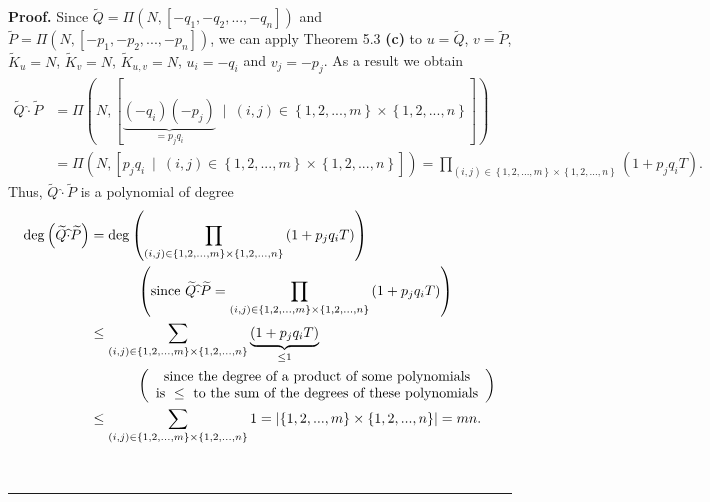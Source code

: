\documentclass[numbers=enddot,12pt,final,onecolumn,notitlepage]{scrartcl}%
\newenvironment{proof}[1][Proof]{\noindent\textbf{#1.} }{\ \rule{0.5em}{0.5em}}
\begin{document}
\begin{proof}
Since $\widetilde{Q}=\Pi\left(  N,\left[  -q_{1},-q_{2},...,-q_{n}\right]
\right)  $ and $\widetilde{P}=\Pi\left(  N,\left[  -p_{1},-p_{2}%
,...,-p_{n}\right]  \right)  $, we can apply Theorem 5.3 \textbf{(c)} to
$u=\widetilde{Q}$, $v=\widetilde{P}$, $\widetilde{K}_{u}=N$, $\widetilde{K}%
_{v}=N$, $\widetilde{K}_{u,v}=N$, $u_{i}=-q_{i}$ and $v_{j}=-p_{j}$. As a
result we obtain%
\begin{align*}
\widetilde{Q}\widehat{\cdot}\widetilde{P}  &  =\Pi\left(  N,\left[
\underbrace{\left(  -q_{i}\right)  \left(  -p_{j}\right)  }_{=p_{j}q_{i}%
}\ \mid\ \left(  i,j\right)  \in\left\{  1,2,...,m\right\}  \times\left\{
1,2,...,n\right\}  \right]  \right) \\
&  =\Pi\left(  N,\left[  p_{j}q_{i}\ \mid\ \left(  i,j\right)  \in\left\{
1,2,...,m\right\}  \times\left\{  1,2,...,n\right\}  \right]  \right)
=\prod\limits_{\left(  i,j\right)  \in\left\{  1,2,...,m\right\}
\times\left\{  1,2,...,n\right\}  }\left(  1+p_{j}q_{i}T\right)  .
\end{align*}
Thus, $\widetilde{Q}\widehat{\cdot}\widetilde{P}$ is a polynomial of degree%
\begin{align*}
\deg\left(  \widetilde{Q}\widehat{\cdot}\widetilde{P}\right)   &  =\deg\left(
\prod\limits_{\left(  i,j\right)  \in\left\{  1,2,...,m\right\}
\times\left\{  1,2,...,n\right\}  }\left(  1+p_{j}q_{i}T\right)  \right) \\
&  \ \ \ \ \ \ \ \ \ \ \left(  \text{since }\widetilde{Q}\widehat{\cdot
}\widetilde{P}=\prod\limits_{\left(  i,j\right)  \in\left\{
1,2,...,m\right\}  \times\left\{  1,2,...,n\right\}  }\left(  1+p_{j}%
q_{i}T\right)  \right) \\
&  \leq\sum\limits_{\left(  i,j\right)  \in\left\{  1,2,...,m\right\}
\times\left\{  1,2,...,n\right\}  }\underbrace{\left(  1+p_{j}q_{i}T\right)
}_{\leq1}\\
&  \ \ \ \ \ \ \ \ \ \ \left(
\begin{array}
[c]{c}%
\text{since the degree of a product of some polynomials}\\
\text{is }\leq\text{ to the sum of the degrees of these polynomials}%
\end{array}
\right) \\
&  \leq\sum\limits_{\left(  i,j\right)  \in\left\{  1,2,...,m\right\}
\times\left\{  1,2,...,n\right\}  }1=\left\vert \left\{  1,2,...,m\right\}
\times\left\{  1,2,...,n\right\}  \right\vert =mn.
\end{align*}



\end{proof}
\end{document}
